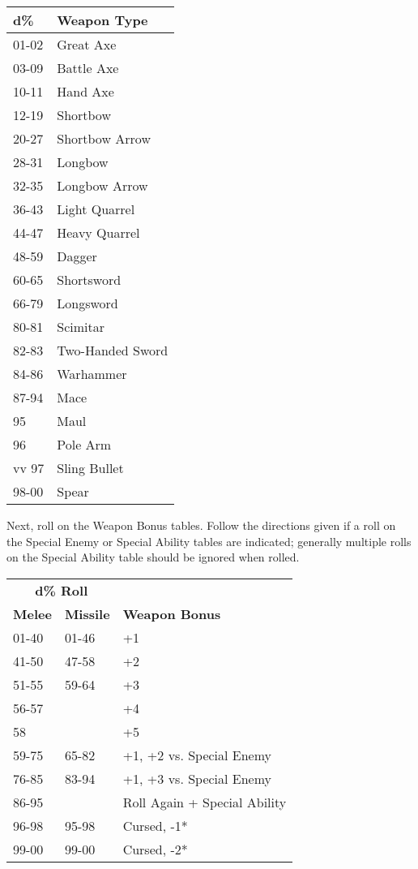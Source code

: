 \documentclass[a4paper,twoside,openany,10pt]{book}
\begin{document}
\begin{multicols}{2}
\begin{tabular*}{0.93\linewidth}{@{\extracolsep{\fill}}ll}
\textbf{d\%} & \textbf{Weapon Type} \\\toprule
01-02 & Great Axe \\\hline
03-09 & Battle Axe \\\hline
10-11 & Hand Axe \\\hline
12-19 & Shortbow \\\hline
20-27 & Shortbow Arrow \\\hline
28-31 & Longbow \\\hline
32-35 & Longbow Arrow \\\hline
36-43 & Light Quarrel \\\hline
44-47 & Heavy Quarrel \\\hline
48-59 & Dagger \\\hline
60-65 & Shortsword \\\hline
66-79 & Longsword \\\hline
80-81 & Scimitar \\\hline
82-83 & Two-Handed Sword \\\hline
84-86 & Warhammer \\\hline
87-94 & Mace \\\hline
95 & Maul \\\hline
96 & Pole Arm \\vv
97 & Sling Bullet \\
98-00 & Spear \\\bottomrule
\end{tabular*}\medskip

Next, roll on the Weapon Bonus tables. Follow the directions given if a roll on the Special Enemy or Special Ability tables are indicated; generally multiple rolls on the Special Ability table should be ignored when rolled.\medskip

\begin{tabular*}{0.93\linewidth}{@{\extracolsep{\fill}}lll}
\multicolumn{2}{c}{\textbf{d\% Roll}}&  \\
\textbf{Melee} & \textbf{Missile} & \textbf{Weapon Bonus} \\\toprule
01-40 & 01-46 & +1 \\\hline
41-50 & 47-58 & +2 \\\hline
51-55 & 59-64 & +3 \\\hline
56-57 & & +4 \\\hline
58 & & +5 \\\hline
59-75 & 65-82 & +1, +2 vs. Special Enemy \\\hline
76-85 & 83-94 & +1, +3 vs. Special Enemy \\\hline
86-95 & & Roll Again + Special Ability \\\hline
96-98 & 95-98 & Cursed, -1* \\\hline
99-00 & 99-00 & Cursed, -2* \\\bottomrule
\end{tabular*}\medskip


\end{multicols}
\end{document}

